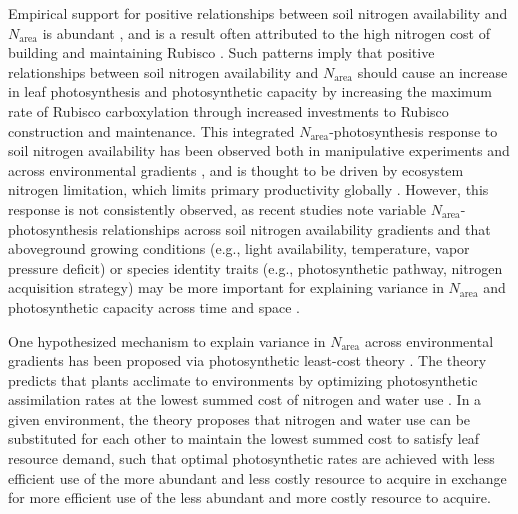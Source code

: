 Empirical support for positive relationships between soil nitrogen availability and $N_\mathrm{area}$ is abundant , and is a result often attributed to the high nitrogen cost of building and maintaining Rubisco . Such patterns imply that positive relationships between soil nitrogen availability and $N_\mathrm{area}$ should cause an increase in leaf photosynthesis and photosynthetic capacity by increasing the maximum rate of Rubisco carboxylation through increased investments to Rubisco construction and maintenance. This integrated $N_\mathrm{area}$-photosynthesis response to soil nitrogen availability has been observed both in manipulative experiments and across environmental gradients , and is thought to be driven by ecosystem nitrogen limitation, which limits primary productivity globally . However, this response is not consistently observed, as recent studies note variable $N_\mathrm{area}$-photosynthesis relationships across soil nitrogen availability gradients  and that aboveground growing conditions (e.g., light availability, temperature, vapor pressure deficit) or species identity traits (e.g., photosynthetic pathway, nitrogen acquisition strategy) may be more important for explaining variance in $N_\mathrm{area}$ and photosynthetic capacity across time and space .

One hypothesized mechanism to explain variance in $N_\mathrm{area}$ across environmental gradients has been proposed via photosynthetic least-cost theory . The theory predicts that plants acclimate to environments by optimizing photosynthetic assimilation rates at the lowest summed cost of nitrogen and water use . In a given environment, the theory proposes that nitrogen and water use can be substituted for each other to maintain the lowest summed cost to satisfy leaf resource demand, such that optimal photosynthetic rates are achieved with less efficient use of the more abundant and less costly resource to acquire in exchange for more efficient use of the less abundant and more costly resource to acquire. 

